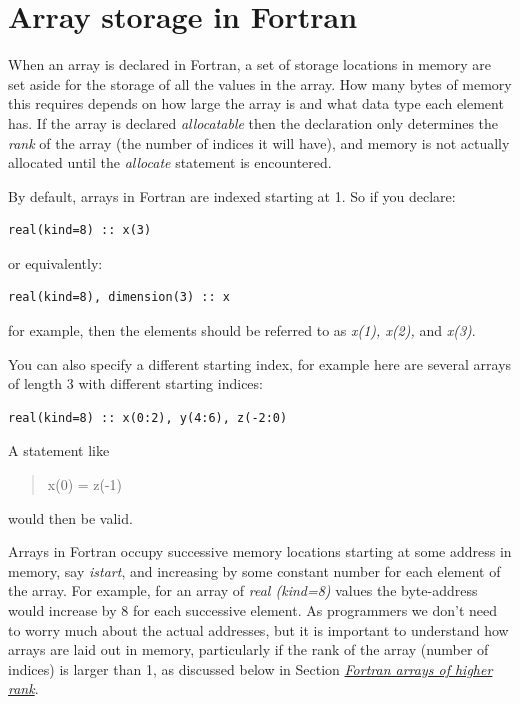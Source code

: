 \documentclass[letterpaper,10pt,english]{sphinxmanual}
\begin{document}
\section{Array storage in Fortran}
\label{fortran_arrays:array-storage-in-fortran}\label{fortran_arrays:fortran-arrays}\label{fortran_arrays::doc}
When an array is declared in Fortran, a set of storage locations in memory
are set aside for the storage of all the values in the array.  How many
bytes of memory this requires depends on how large the array is and what
data type each element has. If the array is declared \emph{allocatable} then the
declaration only determines the \emph{rank} of the array (the number of
indices it will have), and memory is not actually allocated until the
\emph{allocate} statement is encountered.

By default, arrays in Fortran are indexed starting at 1. So if you declare:

\begin{Verbatim}[commandchars=\\\{\}]
real(kind=8) :: x(3)
\end{Verbatim}

or equivalently:

\begin{Verbatim}[commandchars=\\\{\}]
real(kind=8), dimension(3) :: x
\end{Verbatim}

for example, then the elements should be referred to as \emph{x(1), x(2),} and
\emph{x(3)}.

You can also specify a different starting index, for example here are
several arrays of length 3 with different starting indices:

\begin{Verbatim}[commandchars=\\\{\}]
real(kind=8) :: x(0:2), y(4:6), z(-2:0)
\end{Verbatim}

A statement like
\begin{quote}

x(0) = z(-1)
\end{quote}

would then be valid.

Arrays in Fortran occupy successive memory locations starting at some
address in memory, say \emph{istart}, and increasing by some constant number for
each element of the array.  For example, for an array of \emph{real (kind=8)} values
the byte-address would increase by 8 for each successive element.  As
programmers we don't need to worry much about the actual addresses, but it
is important to understand how arrays are laid out in memory, particularly
if the rank of the array (number of indices) is larger than 1, as discussed
below in Section {\hyperref[fortran_arrays:fortran-arrays-hirank]{\emph{Fortran arrays of higher rank}}}.
\end{document}
